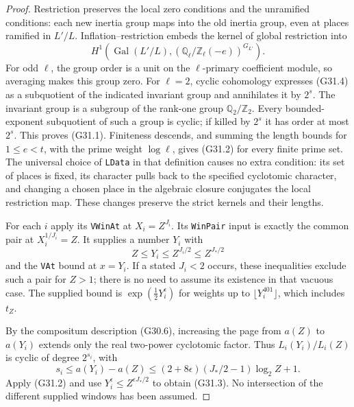 \begin{proof}
Restriction preserves the local zero conditions and the
unramified conditions: each new inertia group maps into
the old inertia group, even at places ramified in $L'/L$.
Inflation--restriction embeds the kernel of global
restriction into
\[
 H^1\left(\operatorname{Gal}(L'/L),
  (\mathbb Q_\ell/\mathbb Z_\ell(-e))^{G_{L'}}\right).
                                                               \tag{G31.4}
\]
For odd $\ell$, the group order is a unit on the
$\ell$-primary coefficient module, so averaging makes
this group zero.  For $\ell=2$, cyclic cohomology expresses
(G31.4) as a subquotient of the indicated invariant group
and annihilates it by $2^s$.  The invariant group is a
subgroup of the rank-one group $\mathbb Q_2/\mathbb Z_2$.
Every bounded-exponent subquotient of such a group is
cyclic; if killed by $2^s$ it has order at most $2^s$.
This proves (G31.1).  Finiteness descends, and summing the
length bounds for $1\leq e<t$, with the prime weight
$\log\ell$, gives (G31.2) for every finite prime set.
The universal choice of \texttt{LData} in that definition
causes no extra condition: its set of places is fixed,
its character pulls back to the specified cyclotomic
character, and changing a chosen place in the algebraic
closure conjugates the local restriction map.  These
changes preserve the strict kernels and their lengths.

For each $i$ apply its \texttt{VWinAt} at
$X_i=Z^{J_i}$.  Its \texttt{WinPair} input is exactly
the common pair at $X_i^{1/J_i}=Z$.
It supplies a number $Y_i$ with
\[
 Z\leq Y_i\leq Z^{J_i/2}\leq Z^{J_*/2}
\]
and the \texttt{VAt} bound at $x=Y_i$.
If a stated $J_i<2$ occurs, these inequalities exclude
such a pair for $Z>1$; there is no need to assume its
existence in that vacuous case.
The supplied bound is
$\exp(\tfrac12Y_i^\epsilon)$ for weights up to
$\lfloor Y_i^{401}\rfloor$, which includes $t_Z$.

By the compositum description (G30.6), increasing the page
from $a(Z)$ to $a(Y_i)$ extends only the real two-power
cyclotomic factor.  Thus
$L_i(Y_i)/L_i(Z)$ is cyclic of degree $2^{s_i}$, with
\[
 s_i\leq a(Y_i)-a(Z)
 \leq(2+8\epsilon)(J_*/2-1)\log_2Z+1.
\]
Apply (G31.2) and use
$Y_i^\epsilon\leq Z^{\epsilon J_*/2}$ to obtain
(G31.3).  No intersection of the different supplied
windows has been assumed.
\end{proof}

